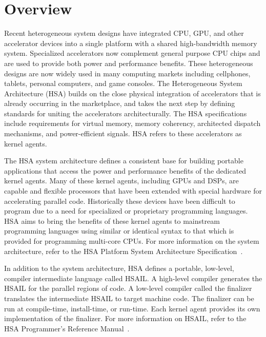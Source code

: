 \documentclass[oneside]{book}
\begin{document}
\section{Overview}\label{overview}
\vspace{-3mm}
Recent heterogeneous system designs have integrated CPU, GPU, and other
accelerator devices into a single platform with a shared high-bandwidth memory
system.  Specialized accelerators now complement general purpose CPU chips and
are used to provide both power and performance benefits.  These
heterogeneous designs are now widely used in many computing markets including
cellphones, tablets, personal computers, and game consoles. The Heterogeneous
System Architecture (HSA) builds on the close physical integration of
accelerators that is already occurring in the marketplace, and takes the next
step by defining standards for uniting the accelerators architecturally. The HSA
specifications include requirements for virtual memory, memory coherency,
architected dispatch mechanisms, and power-efficient signals. HSA refers to
these accelerators as kernel agents.

The HSA system architecture defines a consistent base for building portable
applications that access the power and performance benefits of the dedicated
kernel agents. Many of these kernel agents, including GPUs and DSPs, are capable
and flexible processors that have been extended with special hardware for
accelerating parallel code. Historically these devices have been difficult to
program due to a need for specialized or proprietary programming languages. HSA
aims to bring the benefits of these kernel agents to mainstream programming
languages using similar or identical syntax to that which is provided for
programming multi-core CPUs. For more information on the system architecture,
refer to the HSA Platform System Architecture Specification~\cite{sar}.

In addition to the system architecture, HSA defines a portable, low-level,
compiler intermediate language called HSAIL.  A high-level compiler
generates the HSAIL for the parallel regions of code. A low-level compiler
called the finalizer translates the intermediate HSAIL to target machine
code. The finalizer can be run at compile-time, install-time, or run-time. Each
kernel agent provides its own implementation of the finalizer.  For more
information on HSAIL, refer to the HSA Programmer's Reference Manual~\cite{prm}.
\end{document}
